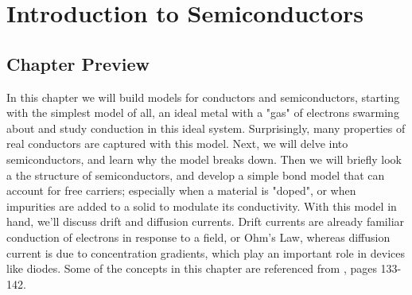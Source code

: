 \chapter{Introduction to Semiconductors}
\label{ch:ch03_semi}
\graphicspath{{./figures/figs_ch03_semi/}}
\section{Chapter Preview}
In this chapter we will build models for conductors and semiconductors, starting with the simplest model of all, an ideal metal with a "gas" of electrons swarming about and study conduction in this ideal system.  Surprisingly, many properties of real conductors are captured with this model.  Next, we will delve into semiconductors, and learn why the model breaks down.  Then we will briefly look a the structure of semiconductors, and  develop a simple bond model that can account for free carriers; especially when a material is "doped", or when impurities are added to a solid to modulate its conductivity.  With this model in hand, we'll discuss drift and diffusion currents.  Drift currents are already familiar conduction of electrons in response to a field, or Ohm's Law, whereas diffusion current is due to concentration gradients, which play an important role in devices like diodes.  Some of the concepts in this chapter are referenced from \cite{purcell}, pages 133-142.
\newpage
